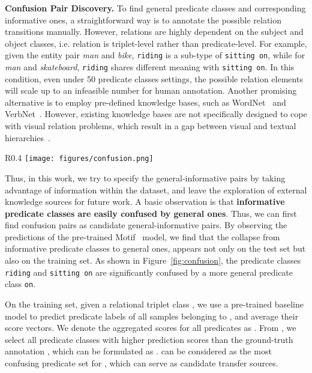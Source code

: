\documentclass[runningheads]{llncs}
\begin{document}
\smallskip
\noindent
\textbf{Confusion Pair Discovery.}
To find general predicate classes and corresponding informative ones, a straightforward way is to annotate the possible relation transitions manually.
However, relations are highly dependent on the subject and object classes, i.e. relation is triplet-level rather than predicate-level.
For example, given the entity pair \textit{man} and \textit{bike}, \texttt{riding} is a sub-type of \texttt{sitting on}, while for \textit{man} and \textit{skateboard}, \texttt{riding} shares different meaning with \texttt{sitting on}.
In this condition, even under 50 predicate classes settings, the possible relation elements will scale up to an infeasible number for human annotation.
Another promising alternative is to employ pre-defined knowledge bases, such as WordNet~\cite{miller1995wordnet} and VerbNet~\cite{kipper2006extending}.
However, existing knowledge bases are not specifically designed to cope with visual relation problems, which result in a gap between visual and textual hierarchies~\cite{wan2020nbdt}.


\begin{wrapfigure}{R}{0.4\textwidth}
\centering
        \texttt{[image: figures/confusion.png]}
        \caption{Confusion matrix of Motif~\cite{zellers2018motif}'s prediction score on all entity pairs in VG training set with the subject \textit{man} and the object \textit{motorcycle}.}
        \label{fig:confusion}
\end{wrapfigure}


Thus, in this work, we try to specify the general-informative pairs by taking advantage of information within the dataset, and leave the exploration of external knowledge sources for future work.
A basic observation is that \textbf{informative predicate classes are easily confused by general ones}.
Thus, we can first find confusion pairs as candidate general-informative pairs.
By observing the predictions of the pre-trained  Motif~\cite{zellers2018motif} model, we find that the collapse from informative predicate classes to general ones, appears not only on the test set but also on the training set.
As shown in Figure~\ref{fig:confusion}, the predicate classes \texttt{riding} and \texttt{sitting on} are significantly confused by a more general predicate class \texttt{on}.

On the training set, given a relational triplet class , we use a pre-trained baseline model to predict predicate labels of all samples belonging to , and average their score vectors.
We denote the aggregated scores for all predicates as .
From , we select all predicate classes with higher prediction scores than the ground-truth annotation , which can be formulated as .
 can be considered as the most confusing predicate set for , which can serve as candidate transfer sources.
\end{document}

